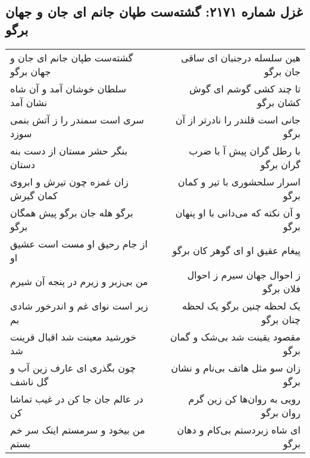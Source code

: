 \begin{center}
\section*{غزل شماره ۲۱۷۱: گشته‌ست طپان جانم ای جان و جهان برگو}
\label{sec:2171}
\begin{longtable}{l p{0.5cm} r}
گشته‌ست طپان جانم ای جان و جهان برگو
&&
هین سلسله درجنبان ای ساقی جان برگو
\\
سلطان خوشان آمد و آن شاه نشان آمد
&&
تا چند کشی گوشم ای گوش کشان برگو
\\
سری است سمندر را ز آتش بنمی سوزد
&&
جانی است قلندر را نادرتر از آن برگو
\\
بنگر حشر مستان از دست بنه دستان
&&
با رطل گران پیش آ با ضرب گران برگو
\\
زان غمزه چون تیرش و ابروی کمان گیرش
&&
اسرار سلحشوری با تیر و کمان برگو
\\
برگو هله جان برگو پیش همگان برگو
&&
و آن نکته که می‌دانی با او پنهان برگو
\\
از جام رحیق او مست است عشیق او
&&
پیغام عقیق او ای گوهر کان برگو
\\
من بی‌زبر و زیرم در پنجه آن شیرم
&&
ز احوال جهان سیرم ز احوال فلان برگو
\\
زیر است نوای غم و اندرخور شادی بم
&&
یک لحظه چنین برگو یک لحظه چنان برگو
\\
خورشید معینت شد اقبال قرینت شد
&&
مقصود یقینت شد بی‌شک و گمان برگو
\\
چون بگذری ای عارف زین آب و گل ناشف
&&
زان سو مثل هاتف بی‌نام و نشان برگو
\\
در عالم جان جا کن در غیب تماشا کن
&&
رویی به روان‌ها کن زین گرم روان برگو
\\
من بیخود و سرمستم اینک سر خم بستم
&&
ای شاه زبردستم بی‌کام و دهان برگو
\\
\end{longtable}
\end{center}
